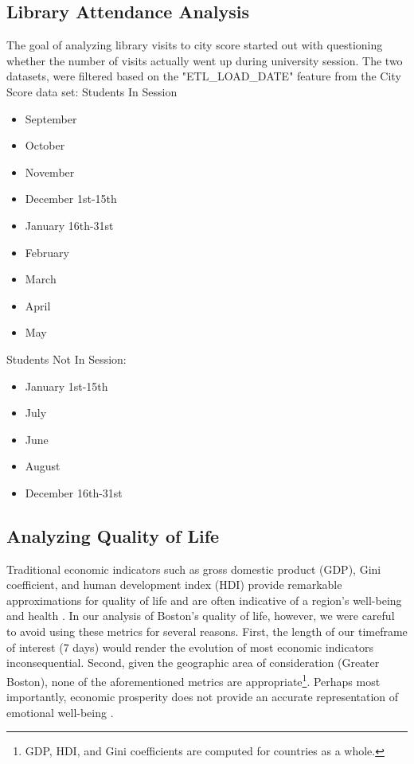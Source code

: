 \documentclass[journal, a4paper]{IEEEtran}
\begin{document}
\subsection{Library Attendance Analysis}
The goal of analyzing library visits to city score started out with questioning whether the number of visits actually went up during university session. The two datasets, were filtered based on the "ETL\_LOAD\_DATE" feature from the City Score data set:
\newline Students In Session
\begin{itemize}
    \item September
    \item October 
    \item November
    \item December 1st-15th
    \item January 16th-31st
    \item February
    \item March
    \item April
    \item May
\end{itemize}
Students Not In Session: 
\begin{itemize}
    \item January 1st-15th
    \item July
    \item June
    \item August
    \item December 16th-31st
\end{itemize}
\subsection{Analyzing Quality of Life}
Traditional economic indicators such as gross domestic product (GDP), Gini coefficient, and human development index (HDI) provide remarkable approximations for quality of life and are often indicative of a region's well-being and health \cite{gallup}\cite{wellbgallup}. In our analysis of Boston's quality of life, however, we were careful to avoid using these metrics for several reasons. First, the length of our timeframe of interest (7 days) would render the evolution of most economic indicators inconsequential. Second, given the geographic area of consideration (Greater Boston), none of the aforementioned metrics are appropriate\footnote{GDP, HDI, and Gini coefficients are computed for countries as a whole.}. Perhaps most importantly, economic prosperity does not provide an accurate representation of emotional well-being \cite{wellbgallup}. 
\end{document}
